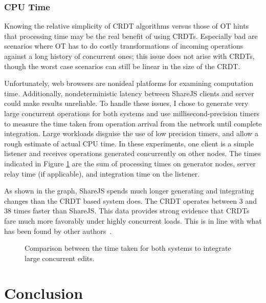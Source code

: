 \documentclass[12pt,a4paper,twoside,openright]{report}
\begin{document}
		
	
		\subsection{CPU Time}
			Knowing the relative simplicity of CRDT algorithms versus those of OT hints that processing time may be the real benefit of using CRDTs. Especially bad are scenarios where OT has to do costly transformations of incoming operations against a long history of concurrent ones; this issue does not arise with CRDTs, though the worst case scenarios can still be linear in the size of the CRDT.
			
			Unfortunately, web browsers are nonideal platforms for examining computation time. Additionally, nondeterministic latency between ShareJS clients and server could make results unreliable. To handle these issues, I chose to generate very large concurrent operations for both systems and use millisecond-precision timers to measure the time taken from operation arrival from the network until complete integration. Large workloads disguise the use of low precision timers, and allow a rough estimate of actual CPU time. In these experiments, one client is a simple listener and receives operations generated concurrently on other nodes. The times indicated in Figure \ref{fig:cputime} are the sum of processing times on generator nodes, server relay time (if applicable), and integration time on the listener.
			
			As shown in the graph, ShareJS spends much longer generating and integrating changes than the CRDT based system does. The CRDT operates between 3 and 38 times faster than ShareJS. This data provides strong evidence that CRDTs fare much more favorably under highly concurrent loads. This is in line with what has been found by other authors~\cite{ahmed2011evaluating}.
			
			\begin{figure}[htb]
				\centering
				
				\caption[CPU Time] {Comparison between the time taken for both systems to integrate large concurrent edits.}
				\label{fig:cputime}
			\end{figure}		
	
		
		
		
		
		
		


\chapter{Conclusion}
\end{document}
